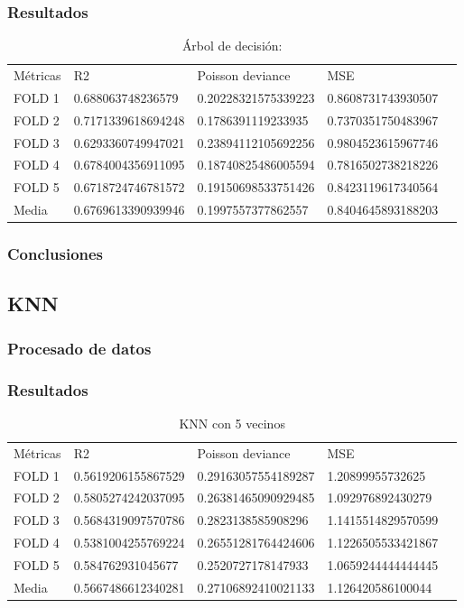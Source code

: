 \subsubsection{Resultados}
\begin{table}[htbp]
    \begin{tabular}{|l|l|l|l|l}
    \cline{1-4}
    Métricas & R2                 & Poisson deviance    & MSE                  \\ \cline{1-4}
    FOLD 1   & 0.688063748236579  & 0.20228321575339223 & 0.8608731743930507   \\ \cline{1-4}
    FOLD 2   & 0.7171339618694248 & 0.1786391119233935  & 0.7370351750483967   \\ \cline{1-4}
    FOLD 3   & 0.6293360749947021 & 0.23894112105692256 & 0.9804523615967746   \\ \cline{1-4}
    FOLD 4   & 0.6784004356911095 & 0.18740825486005594 & 0.7816502738218226   \\ \cline{1-4}
    FOLD 5   & 0.6718724746781572 & 0.19150698533751426 & 0.8423119617340564   \\ \cline{1-4}
    Media    & 0.6769613390939946 & 0.1997557377862557  & 0.8404645893188203   \\ \cline{1-4}
    \end{tabular}
	\caption{Árbol de decisión: }
\end{table}
\subsubsection{Conclusiones}
\subsection{KNN}
\subsubsection{Procesado de datos}
\subsubsection{Resultados}
\begin{table}[htbp]
    \begin{tabular}{|l|l|l|l|l}
    \cline{1-4}
    Métricas & R2                 & Poisson deviance     & MSE                 \\ \cline{1-4}
    FOLD 1   & 0.5619206155867529 & 0.29163057554189287  & 1.20899955732625    \\ \cline{1-4}
    FOLD 2   & 0.5805274242037095 & 0.26381465090929485  & 1.092976892430279   \\ \cline{1-4}
    FOLD 3   & 0.5684319097570786 & 0.2823138585908296   & 1.1415514829570599  \\ \cline{1-4}
    FOLD 4   & 0.5381004255769224 &  0.26551281764424606 & 1.1226505533421867  \\ \cline{1-4}
    FOLD 5   & 0.584762931045677  & 0.2520727178147933   & 1.0659244444444445  \\ \cline{1-4}
    Media    & 0.5667486612340281 & 0.27106892410021133  & 1.126420586100044   \\ \cline{1-4}
   \end{tabular}
	\caption{KNN con 5 vecinos}
\end{table}
